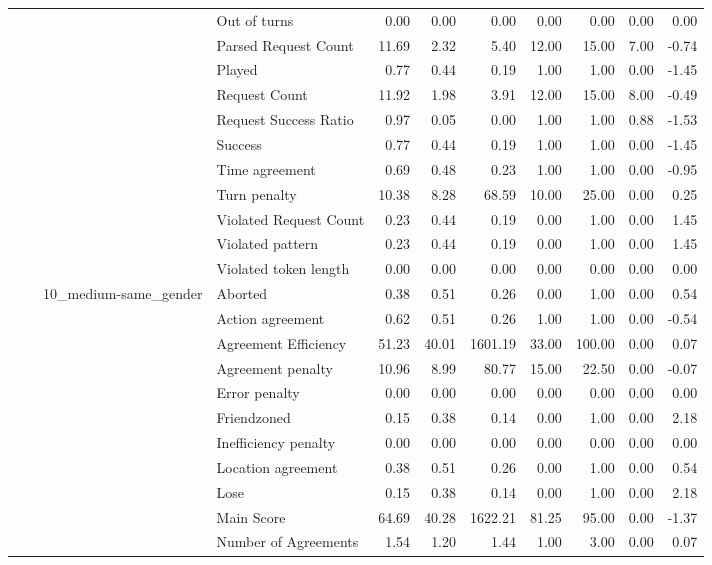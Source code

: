 \begin{tabular}{llllrrrrrrr}
 &  &  & Out of turns & 0.00 & 0.00 & 0.00 & 0.00 & 0.00 & 0.00 & 0.00 \\
 &  &  & Parsed Request Count & 11.69 & 2.32 & 5.40 & 12.00 & 15.00 & 7.00 & -0.74 \\
 &  &  & Played & 0.77 & 0.44 & 0.19 & 1.00 & 1.00 & 0.00 & -1.45 \\
 &  &  & Request Count & 11.92 & 1.98 & 3.91 & 12.00 & 15.00 & 8.00 & -0.49 \\
 &  &  & Request Success Ratio & 0.97 & 0.05 & 0.00 & 1.00 & 1.00 & 0.88 & -1.53 \\
 &  &  & Success & 0.77 & 0.44 & 0.19 & 1.00 & 1.00 & 0.00 & -1.45 \\
 &  &  & Time agreement & 0.69 & 0.48 & 0.23 & 1.00 & 1.00 & 0.00 & -0.95 \\
 &  &  & Turn penalty & 10.38 & 8.28 & 68.59 & 10.00 & 25.00 & 0.00 & 0.25 \\
 &  &  & Violated Request Count & 0.23 & 0.44 & 0.19 & 0.00 & 1.00 & 0.00 & 1.45 \\
 &  &  & Violated pattern & 0.23 & 0.44 & 0.19 & 0.00 & 1.00 & 0.00 & 1.45 \\
 &  &  & Violated token length & 0.00 & 0.00 & 0.00 & 0.00 & 0.00 & 0.00 & 0.00 \\
\cline{3-11}
 &  & \multirow[t]{27}{*}{10_medium-same_gender} & Aborted & 0.38 & 0.51 & 0.26 & 0.00 & 1.00 & 0.00 & 0.54 \\
 &  &  & Action agreement & 0.62 & 0.51 & 0.26 & 1.00 & 1.00 & 0.00 & -0.54 \\
 &  &  & Agreement Efficiency & 51.23 & 40.01 & 1601.19 & 33.00 & 100.00 & 0.00 & 0.07 \\
 &  &  & Agreement penalty & 10.96 & 8.99 & 80.77 & 15.00 & 22.50 & 0.00 & -0.07 \\
 &  &  & Error penalty & 0.00 & 0.00 & 0.00 & 0.00 & 0.00 & 0.00 & 0.00 \\
 &  &  & Friendzoned & 0.15 & 0.38 & 0.14 & 0.00 & 1.00 & 0.00 & 2.18 \\
 &  &  & Inefficiency penalty & 0.00 & 0.00 & 0.00 & 0.00 & 0.00 & 0.00 & 0.00 \\
 &  &  & Location agreement & 0.38 & 0.51 & 0.26 & 0.00 & 1.00 & 0.00 & 0.54 \\
 &  &  & Lose & 0.15 & 0.38 & 0.14 & 0.00 & 1.00 & 0.00 & 2.18 \\
 &  &  & Main Score & 64.69 & 40.28 & 1622.21 & 81.25 & 95.00 & 0.00 & -1.37 \\
 &  &  & Number of Agreements & 1.54 & 1.20 & 1.44 & 1.00 & 3.00 & 0.00 & 0.07 \\

\end{tabular}
